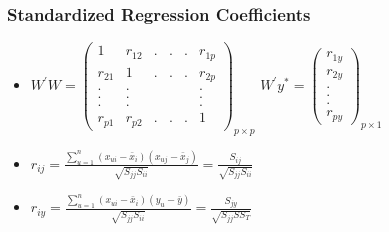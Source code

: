 \documentclass[10pt]{beamer} %
\begin{document}
\begin{frame}
   \frametitle{Standardized Regression Coefficients}
   \begin{itemize}
      \item $W^{'}W=\begin{pmatrix}
            1 & r_{12} & . & . & . & r_{1p}\\
            r_{21} & 1 & . & . & . & r_{2p}\\
            . & . & & & & . \\
            . & . & & & & . \\
            . & . & & & & . \\
            r_{p1} & r_{p2} & . & . & . & 1
            \end{pmatrix}_{p \times p}$ $W^{'}{y}^* = \begin{pmatrix}
            r_{1y} \\ r_{2y} \\ . \\ . \\ . \\ r_{py}
         \end{pmatrix}_{p \times 1}$
      \item $r_{ij} = \frac{\sum_{u=1}^{n}(x_{ui} - \bar{x}_i)(x_{uj} -
         \bar{x}_j)}{\sqrt{S_{jj}S_{ii}}} =\frac{S_{ij}}{\sqrt{S_{jj}S_{ii}}}$
      \item $r_{iy}= \frac{\sum_{u=1}^{n}(x_{ui} - \bar{x}_i)(y_{u} -
         \bar{y})}{\sqrt{S_{jj}S_{ii}}} = \frac{S_{jy}}{\sqrt{S_{jj}SS_{T}}}$
   \end{itemize}
\end{frame}
\end{document}
